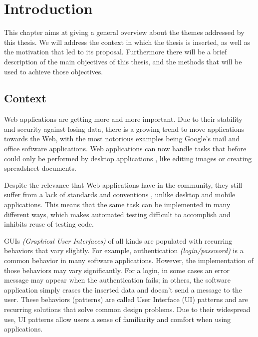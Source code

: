 \chapter{Introduction} \label{chap:intro}


This chapter aims at giving a general overview about the themes addressed by this thesis. We will address the context in which the thesis is inserted, as well as the motivation that led to its proposal. Furthermore there will be a brief description of the main objectives of this thesis, and the methods that will be used to achieve those objectives.

\section{Context} \label{sec:context}

Web applications are getting more and more important. Due to their stability and security against losing data, there is a growing trend to move applications towards the Web, with the most notorious examples being Google's mail and office software applications. Web applications can now handle tasks that before could only be performed by desktop applications \cite{garrett2005ajax}, like editing images or creating spreadsheet documents.

Despite the relevance that Web applications have in the community, they still suffer from a lack of standards and conventions \cite{constantine2002usage}, unlike desktop and mobile applications. This means that the same task can be implemented in many different ways, which makes automated testing difficult to accomplish and inhibits reuse of testing code.

GUIs \textit{(Graphical User Interfaces)} of all kinds are populated with recurring behaviors that vary slightly. For example, authentication \textit{(login/password)} is a common behavior in many software applications. However, the implementation of those behaviors may vary significantly. For a login, in some cases an error message may appear when the authentication fails; in others, the software application simply erases the inserted data and doesn't send a message to the user. These behaviors (patterns) are called User Interface (UI) patterns \cite{van2001patterns} and are recurring solutions that solve common design problems. Due to their widespread use, UI patterns allow users a sense of familiarity and comfort when using applications.

